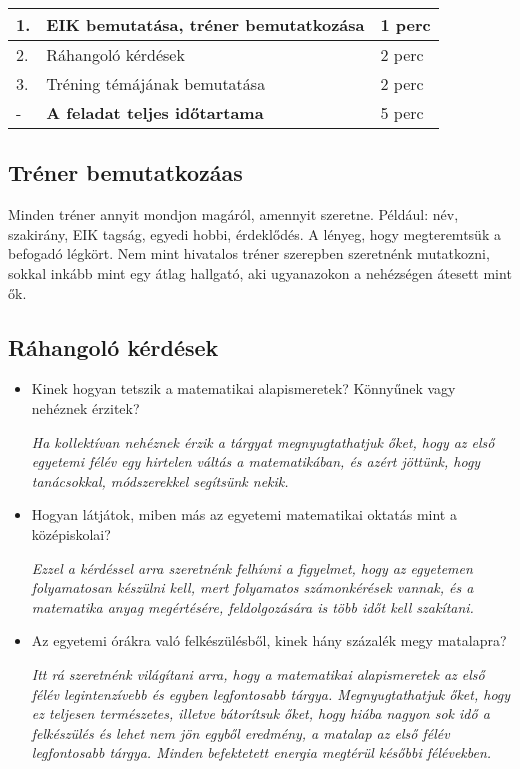 \documentclass[../Main.tex]{subfiles}
\begin{document}
\begin{center}
    \begin{tabular}{| m{1.3 em} | m{} | m{} |}
    \hline
    1. & EIK bemutatása, tréner bemutatkozása & 1 perc \\
    \hline
    2. & Ráhangoló kérdések & 2 perc \\
    \hline
    3. & Tréning témájának bemutatása & 2 perc \\
    \hline
    - & \textbf{A feladat teljes időtartama} & 5 perc \\
    \hline
    \end{tabular}
\end{center}

\subsection{Tréner bemutatkozáas}

Minden tréner annyit mondjon magáról, amennyit szeretne. Például: név, szakirány, EIK tagság,
egyedi hobbi, érdeklődés. A lényeg, hogy megteremtsük a befogadó légkört. Nem mint hivatalos
tréner szerepben szeretnénk mutatkozni, sokkal inkább mint egy átlag hallgató, aki ugyanazokon
a nehézségen átesett mint ők. \par

\subsection{Ráhangoló kérdések}
\begin{itemize}
    \item Kinek hogyan tetszik a matematikai alapismeretek? Könnyűnek vagy nehéznek érzitek?
    
    \textit{Ha kollektívan nehéznek érzik a tárgyat megnyugtathatjuk őket, hogy az első egyetemi félév
    egy hirtelen váltás a matematikában, és azért jöttünk, hogy tanácsokkal, módszerekkel segítsünk nekik.}

    \item Hogyan látjátok, miben más az egyetemi matematikai oktatás mint a középiskolai?
    
    \textit{Ezzel a kérdéssel arra szeretnénk felhívni a figyelmet, hogy az egyetemen folyamatosan
    készülni kell, mert folyamatos számonkérések vannak, és a matematika anyag megértésére, feldolgozására
    is több időt kell szakítani.}

    \item Az egyetemi órákra való felkészülésből, kinek hány százalék megy matalapra?
    
    \textit{Itt rá szeretnénk világítani arra, hogy a matematikai alapismeretek az első félév legintenzívebb
    és egyben legfontosabb tárgya. Megnyugtathatjuk őket, hogy ez teljesen természetes, illetve bátorítsuk őket,
    hogy hiába nagyon sok idő a felkészülés és lehet nem jön egyből eredmény, a matalap az első félév legfontosabb
    tárgya. Minden befektetett energia megtérül későbbi félévekben.}
\end{itemize}
\end{document}
